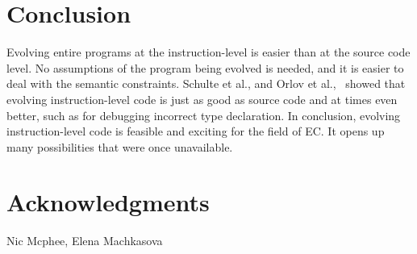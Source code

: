 \documentclass{sig-alternate}
\begin{document}
\section{Conclusion}
Evolving entire programs at the instruction-level is easier than at the source code level. No assumptions of the program being evolved is needed, and it is easier to deal with the semantic constraints. Schulte et al., and Orlov et al.,~\cite{Assembly:2010, FINCH:2011} showed that evolving instruction-level code is just as good as source code and at times even better, such as for debugging incorrect type declaration. In conclusion, evolving instruction-level code is feasible and exciting for the field of EC. It opens up many possibilities that were once unavailable.

\section{Acknowledgments}
Nic Mcphee, Elena Machkasova

%

%
%
\end{document}
